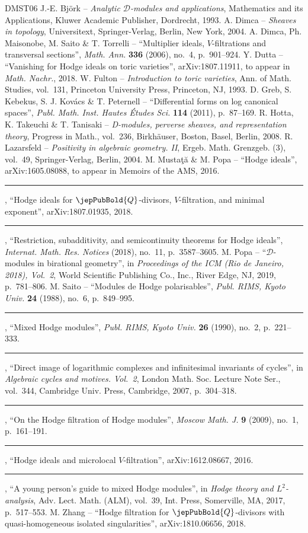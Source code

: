 \begin{thebibliography}{DMST06}
 J.-E. Björk -- \emph{Analytic $\mathscr D$-modules and applications}, Mathematics and its Applications, Kluwer Academic Publisher, Dordrecht, 1993.
 A. Dimca -- \emph{Sheaves in topology}, Universitext, Springer-Verlag, Berlin, New York, 2004.
 A. Dimca, Ph. Maisonobe, M. Saito \& T. Torrelli -- ``Multiplier ideals, $V$-filtrations and transversal sections'', \emph{Math. Ann.} \textbf{336} (2006), no.~4, p.~901--924.
 Y. Dutta -- ``Vanishing for Hodge ideals on toric varieties'', arXiv:1807.11911, to appear in \emph{Math. Nachr.}, 2018.
 W. Fulton -- \emph{Introduction to toric varieties}, Ann. of Math. Studies, vol.~131, Princeton University Press, Princeton, NJ, 1993.
 D. Greb, S. Kebekus, S. J. Kovács \& T. Peternell -- ``Differential forms on log canonical spaces'', \emph{Publ. Math. Inst. Hautes Études Sci.} \textbf{114} (2011), p.~87--169.
 R. Hotta, K. Takeuchi \& T. Tanisaki -- \emph{D-modules, perverse sheaves, and representation theory}, Progress in Math., vol.~236, Birkhäuser, Boston, Basel, Berlin, 2008.
 R. Lazarsfeld -- \emph{Positivity in algebraic geometry. II}, Ergeb. Math. Grenzgeb. (3), vol.~49, Springer-Verlag, Berlin, 2004.
 M. Mustaţă \& M. Popa -- ``Hodge ideals'', arXiv:1605.08088, to appear in Memoirs of the AMS, 2016.
 \rule{1.2em}{0.1pt}, ``Hodge ideals for $\jepPubBold{Q}$-divisors, $V$-filtration, and minimal exponent'', arXiv:1807.01935, 2018.
 \rule{1.2em}{0.1pt}, ``Restriction, subadditivity, and semicontinuity theorems for Hodge ideals'', \emph{Internat. Math. Res. Notices} (2018), no.~11, p.~3587--3605.
 M. Popa -- ``$\mathscr D$-modules in birational geometry'', in \emph{Proceedings of the ICM (Rio de Janeiro, 2018), Vol.~2}, World Scientific Publishing Co., Inc., River Edge, NJ, 2019, p.~781--806.
 M. Saito -- ``Modules de Hodge polarisables'', \emph{Publ. RIMS, Kyoto Univ.} \textbf{24} (1988), no.~6, p.~849--995.
 \rule{1.2em}{0.1pt}, ``Mixed Hodge modules'', \emph{Publ. RIMS, Kyoto Univ.} \textbf{26} (1990), no.~2, p.~221--333.
 \rule{1.2em}{0.1pt}, ``Direct image of logarithmic complexes and infinitesimal invariants of cycles'', in \emph{Algebraic cycles and motives. Vol.~2}, London Math. Soc. Lecture Note Ser., vol.~344, Cambridge Univ. Press, Cambridge, 2007, p.~304--318.
 \rule{1.2em}{0.1pt}, ``On the Hodge filtration of Hodge modules'', \emph{Moscow Math. J.} \textbf{9} (2009), no.~1, p.~161--191.
 \rule{1.2em}{0.1pt}, ``Hodge ideals and microlocal $V$-filtration'', arXiv:1612.08667, 2016.
 \rule{1.2em}{0.1pt}, ``A young person's guide to mixed Hodge modules'', in \emph{Hodge theory and $L^2$-analysis}, Adv. Lect. Math. (ALM), vol.~39, Int. Press, Somerville, MA, 2017, p.~517--553.
 M. Zhang -- ``Hodge filtration for $\jepPubBold{Q}$-divisors with quasi-homogeneous isolated singularities'', arXiv:1810.06656, 2018.
\end{thebibliography}
